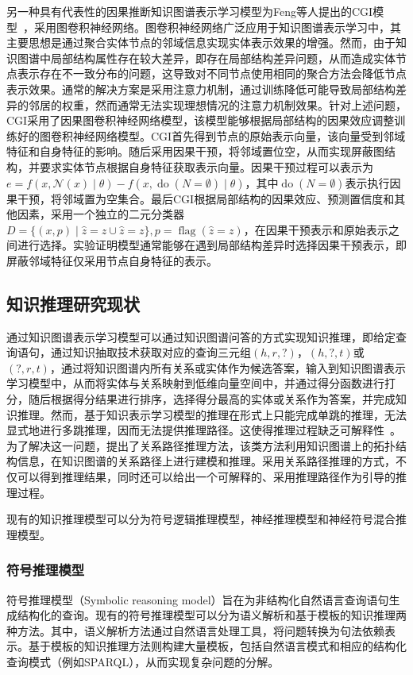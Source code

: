 \documentclass[algorithmlist, AutoFakeBold, AutoFakeSlant, figurelist, tablelist, nomlist, engineering]{seuthesix}
\begin{document}
另一种具有代表性的因果推断知识图谱表示学习模型为Feng等人提出的CGI模型~\cite{feng2021should}，采用图卷积神经网络。图卷积神经网络广泛应用于知识图谱表示学习中，其主要思想是通过聚合实体节点的邻域信息实现实体表示效果的增强。然而，由于知识图谱中局部结构属性存在较大差异，即存在局部结构差异问题，从而造成实体节点表示存在不一致分布的问题，这导致对不同节点使用相同的聚合方法会降低节点表示效果。通常的解决方案是采用注意力机制，通过训练降低可能导致局部结构差异的邻居的权重，然而通常无法实现理想情况的注意力机制效果。针对上述问题，CGI采用了因果图卷积神经网络模型，该模型能够根据局部结构的因果效应调整训练好的图卷积神经网络模型。CGI首先得到节点的原始表示向量，该向量受到邻域特征和自身特征的影响。随后采用因果干预，将邻域置位空，从而实现屏蔽图结构，并要求实体节点根据自身特征获取表示向量。因果干预过程可以表示为$e=f(x, \mathcal{N}(x) \mid \theta)-f(x, \operatorname{do}(N=\emptyset) \mid \theta)$，其中$\operatorname{do}(N=\emptyset)$表示执行因果干预，将邻域置为空集合。最后CGI根据局部结构的因果效应、预测置信度和其他因素，采用一个独立的二元分类器$D=\{(x, p) \mid \hat{z}=z \cup \hat{z}=z\}, p=\operatorname{flag}(\hat{z}=z)$，在因果干预表示和原始表示之间进行选择。实验证明模型通常能够在遇到局部结构差异时选择因果干预表示，即屏蔽邻域特征仅采用节点自身特征的表示。

\subsection{知识推理研究现状}
通过知识图谱表示学习模型可以通过知识图谱问答的方式实现知识推理，即给定查询语句，通过知识抽取技术获取对应的查询三元组$\left(h, r, ?\right)$，$\left(h, ?, t\right)$或$\left(?, r, t\right)$，通过将知识图谱内所有关系或实体作为候选答案，输入到知识图谱表示学习模型中，从而将实体与关系映射到低维向量空间中，并通过得分函数进行打分，随后根据得分结果进行排序，选择得分最高的实体或关系作为答案，并完成知识推理。然而，基于知识表示学习模型的推理在形式上只能完成单跳的推理，无法显式地进行多跳推理，因而无法提供推理路径。这使得推理过程缺乏可解释性~\cite{wang2019deeppath}。为了解决这一问题，提出了关系路径推理方法，该类方法利用知识图谱上的拓扑结构信息，在知识图谱的关系路径上进行建模和推理。采用关系路径推理的方式，不仅可以得到推理结果，同时还可以给出一个可解释的、采用推理路径作为引导的推理过程。

现有的知识推理模型可以分为符号逻辑推理模型，神经推理模型和神经符号混合推理模型。

\subsubsection{符号推理模型}
符号推理模型（Symbolic reasoning model）旨在为非结构化自然语言查询语句生成结构化的查询。现有的符号推理模型可以分为语义解析和基于模板的知识推理两种方法。其中，语义解析方法通过自然语言处理工具，将问题转换为句法依赖表示。基于模板的知识推理方法则构建大量模板，包括自然语言模式和相应的结构化查询模式（例如SPARQL），从而实现复杂问题的分解。
\end{document}
